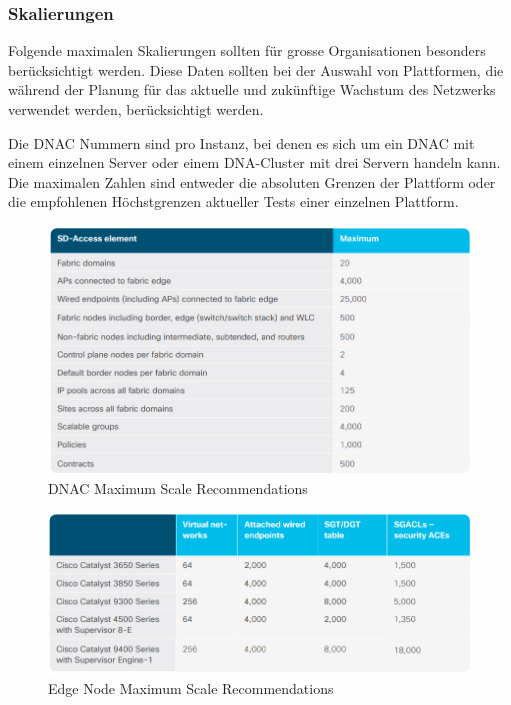 \subsubsection{Skalierungen}
Folgende maximalen Skalierungen sollten für grosse Organisationen besonders berücksichtigt werden. Diese Daten sollten bei der Auswahl von Plattformen, die während der Planung für das aktuelle und zukünftige Wachstum des Netzwerks verwendet werden, berücksichtigt werden.

Die DNAC Nummern sind pro Instanz, bei denen es sich um ein DNAC mit einem einzelnen Server oder einem DNA-Cluster mit drei Servern handeln kann. Die maximalen Zahlen sind entweder die absoluten Grenzen der Plattform oder die empfohlenen Höchstgrenzen aktueller Tests einer einzelnen Plattform.

\begin{figure}[H]
	\centering
	\includegraphics[width=1\linewidth]{img/Analyse/MaxScale-DNAC}
	\caption{DNAC Maximum Scale Recommendations \cite{sda-designguide} }
	\label{fig:DNAC Maximum Scale RecommendationsA}
\end{figure}

\begin{figure}[H]
	\centering
	\includegraphics[width=1\linewidth]{img/Analyse/MaxScale-EdgeNode}
	\caption{Edge Node Maximum Scale Recommendations \cite{sda-designguide} }
	\label{fig:Edge Node Maximum Scale RecommendationsA}
\end{figure}

